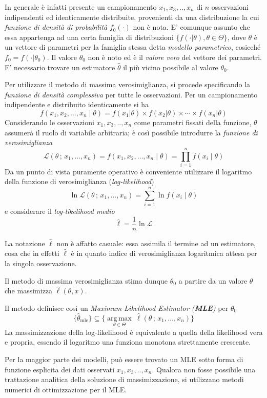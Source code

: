 \documentclass[a4paper]{report}
\begin{document}
In generale è infatti presente un campionamento $x_1,x_3,..,x_n$ di $n$ osservazioni indipendenti ed identicamente distribuite, provenienti da una distribuzione la cui \textit{funzione di densità di probabilità }  $f_0(\cdot)$ non è nota. 
E' comunque assunto che essa appartenga ad una certa famiglia di distribuzioni $ \{f(\cdot |\theta),\theta\in\Theta\} $, dove $\theta$ è un vettore di parametri per la famiglia stessa detta \textit{modello parametrico}, cosicché $f_0=f(\cdot |\theta_0)$. 
Il valore $\theta_0$ non è noto ed è il \textit{valore vero} del vettore dei parametri.
E' necessario trovare un estimatore $\hat{\theta}$ il più vicino possibile al valore $\theta_0$. 

Per utilizzare il metodo di massima verosimiglianza, si procede specificando la \textit{funzione di densità complessiva} per tutte le osservazioni.
Per un campionamento indipendente e distribuito identicamente si ha
\[ f(x_1,x_2,\ldots,x_n\mid\theta) = f(x_1|\theta)\times f(x_2|\theta) \times \cdots \times  f(x_n|\theta)\]
Considerando le osservazioni $x_1,x_3,..,x_n$ come parametri fissati della funzione, $\theta$ assumerà il ruolo di variabile arbitraria; è così possibile introdurre la \textit{funzione di verosimiglianza}
\[ \mathcal{L}(\theta\,;\,x_1,\ldots,x_n) = f(x_1,x_2,\ldots,x_n\mid\theta) = \prod_{i=1}^n f(x_i\mid\theta)\]
Da un punto di vista puramente operativo è conveniente utilizzare il logaritmo della funzione di verosimiglianza (\textit{log-likelihood})
 \[\ln\mathcal{L}(\theta\,;\,x_1,\ldots,x_n) = \sum_{i=1}^n \ln f(x_i\mid\theta)\]
e considerare il \textit{log-likelihood medio}
\[\hat\ell = \frac1n \ln\mathcal{L}\]

La notazione $\hat\ell$ non è affatto casuale: essa assimila il termine ad un estimatore, cosa che in effetti $\hat\ell$ è in quanto indice di verosimiglianza logaritmica attesa per la singola osservazione.

Il metodo di massima verosimiglianza stima dunque $\theta_0$ a partire da un valore $\theta$ che massimizza $\hat\ell(\theta,x)$.

Il metodo definisce così un \textit{Maximum-Likelihood Estimator (\textbf{MLE}) } per $\theta_0$
\[\{ \hat\theta_\mathrm{mle}\} \subseteq \{ \underset{\theta\in\Theta}{\operatorname{arg\,max}}\ \hat\ell(\theta\,;\,x_1,\ldots,x_n) \}\]
La massimizzazione della log-likelihood è equivalente a quella della likelihood vera e propria, essendo il logaritmo una funziona monotona strettamente crescente.

Per la maggior parte dei modelli, può essere trovato un MLE sotto forma di funzione esplicita dei dati osservati $x_1,x_3,..,x_n$.
Qualora non fosse possibile una trattazione analitica della soluzione di massimizzazione, si utilizzano metodi numerici di ottimizzazione per il MLE.
\end{document}
